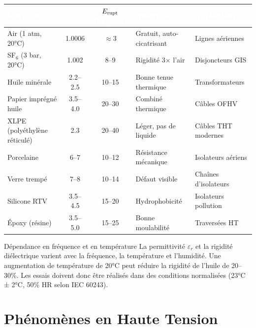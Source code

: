 \documentclass[12pt, a4paper, twoside]{report}
\begin{document}
\begin{center}
\begin{tabularx}{\textwidth}{lccXl}
\toprule
\rowcolor{darkblue}
\textcolor{white}{\textbf{Matériau}} &
\textcolor{white}{\textbf{$\varepsilon_r$}} &
\textcolor{white}{\textbf{$E_{\rm rupt}$ (kV/mm)}} &
\textcolor{white}{\textbf{Avantages}} &
\textcolor{white}{\textbf{Application}} \\
\midrule
Air (1 atm, 20°C) & 1.0006 & $\approx$3 & Gratuit, auto-cicatrisant & Lignes aériennes \\
\rowcolor{lightgray}
SF$_6$ (3 bar, 20°C) & 1.002 & 8--9 & Rigidité 3× l'air & Disjoncteurs GIS \\
Huile minérale & 2.2--2.5 & 10--15 & Bonne tenue thermique & Transformateurs \\
\rowcolor{lightgray}
Papier imprégné huile & 3.5--4.0 & 20--30 & Combiné thermique & Câbles OFHV \\
XLPE (polyéthylène réticulé) & 2.3 & 20--40 & Léger, pas de liquide & Câbles THT modernes \\
\rowcolor{lightgray}
Porcelaine & 6--7 & 10--12 & Résistance mécanique & Isolateurs aériens \\
Verre trempé & 7--8 & 10--14 & Défaut visible & Chaînes d'isolateurs \\
\rowcolor{lightgray}
Silicone RTV & 3.5--4.5 & 15--20 & Hydrophobicité & Isolateurs pollution \\
Époxy (résine) & 3.5--5.0 & 15--25 & Bonne moulabilité & Traversées HT \\
\bottomrule
\end{tabularx}
\end{center}

\begin{warnbox}{Dépendance en fréquence et en température}
La permittivité $\varepsilon_r$ et la rigidité diélectrique varient avec la fréquence, la
température et l'humidité. Une augmentation de température de 20°C peut réduire la rigidité
de l'huile de 20--30\%. Les essais doivent donc être réalisés dans des conditions normalisées
(23°C ± 2°C, 50\% HR selon IEC 60243).
\end{warnbox}

\chapter{Phénomènes en Haute Tension}
\end{document}
